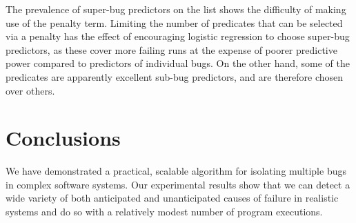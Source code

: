 \documentclass[draft]{sig-alternate}
\begin{document}
The prevalence of super-bug predictors on the list shows the
difficulty of making use of the penalty term.  Limiting the number of
predicates that can be selected via a penalty has the effect of
encouraging logistic regression to choose super-bug predictors, as
these cover more failing runs at the expense of poorer predictive
power compared to predictors of individual bugs.  On the other hand,
some of the predicates are apparently excellent sub-bug predictors,
and are therefore chosen over others.

\section{Conclusions}
\label{sec:conclusions}

We have demonstrated a practical, scalable algorithm for isolating multiple bugs
in complex software systems.  Our experimental results show that we can
detect a wide variety of both anticipated and unanticipated causes of failure
in realistic systems and do so with a relatively modest number of program
executions.


\end{document}
